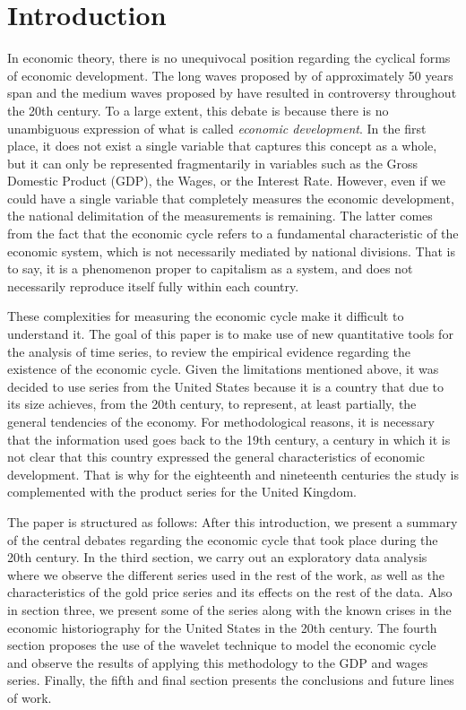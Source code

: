 \documentclass[a4paper]{article}
\begin{document}
	
	\section{Introduction}
	
	In economic theory, there is no unequivocal position regarding the cyclical forms of economic development. The long waves proposed by \cite{kondratieff1979long} of approximately 50 years span and the medium waves proposed by \cite{kuznets1930secular} have resulted in controversy throughout the 20th century. To a large extent, this debate is because there is no unambiguous expression of what is called \textit{economic development}. In the first place, it does not exist a single variable that captures this concept as a whole, but it can only be represented fragmentarily in variables such as the Gross Domestic Product (GDP), the Wages, or the Interest Rate. However, even if we could have a single variable that completely measures the economic development, the national delimitation of the measurements is remaining. The latter comes from the fact that the economic cycle refers to a fundamental characteristic of the economic system, which is not necessarily mediated by national divisions. That is to say, it is a phenomenon proper to capitalism as a system, and does not necessarily reproduce itself fully within each country.
	
	
	These complexities for measuring the economic cycle make it difficult to understand it. The goal of this paper is to make use of new quantitative tools for the analysis of time series, to review the empirical evidence regarding the existence of the economic cycle. Given the limitations mentioned above, it was decided to use series from the United States because it is a country that due to its size achieves, from the 20th century, to represent, at least partially, the general tendencies of the economy. For methodological reasons, it is necessary that the information used goes back to the 19th century, a century in which it is not clear that this country expressed the general characteristics of economic development. That is why for the eighteenth and nineteenth centuries the study is complemented with the product series for the United Kingdom.
	
	The paper is structured as follows: After this introduction, we present a summary of the central debates regarding the economic cycle that took place during the 20th century. In the third section, we carry out an exploratory data analysis where we observe the different series used in the rest of the work, as well as the characteristics of the gold price series and its effects on the rest of the data. Also in section three, we present some of the series along with the known crises in the economic historiography for the United States in the 20th century. The fourth section proposes the use of the wavelet technique to model the economic cycle and observe the results of applying this methodology to the GDP and wages series. Finally, the fifth and final section presents the conclusions and future lines of work.
	
\end{document}
